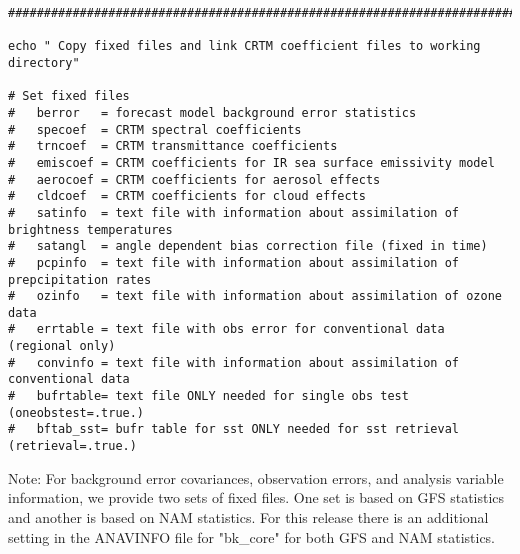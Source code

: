 \begin{footnotesize}
\begin{verbatim}
##################################################################################

echo " Copy fixed files and link CRTM coefficient files to working directory"

# Set fixed files
#   berror   = forecast model background error statistics
#   specoef  = CRTM spectral coefficients
#   trncoef  = CRTM transmittance coefficients
#   emiscoef = CRTM coefficients for IR sea surface emissivity model
#   aerocoef = CRTM coefficients for aerosol effects
#   cldcoef  = CRTM coefficients for cloud effects
#   satinfo  = text file with information about assimilation of brightness temperatures
#   satangl  = angle dependent bias correction file (fixed in time)
#   pcpinfo  = text file with information about assimilation of prepcipitation rates
#   ozinfo   = text file with information about assimilation of ozone data
#   errtable = text file with obs error for conventional data (regional only)
#   convinfo = text file with information about assimilation of conventional data
#   bufrtable= text file ONLY needed for single obs test (oneobstest=.true.)
#   bftab_sst= bufr table for sst ONLY needed for sst retrieval (retrieval=.true.)
\end{verbatim}
\end{footnotesize}

Note: For background error covariances, observation errors, and analysis variable information, we provide two sets of fixed files. One set is based on GFS statistics and another is based on NAM statistics. For this release there is an additional setting in the ANAVINFO file for "bk\_core" for both GFS and NAM statistics.

